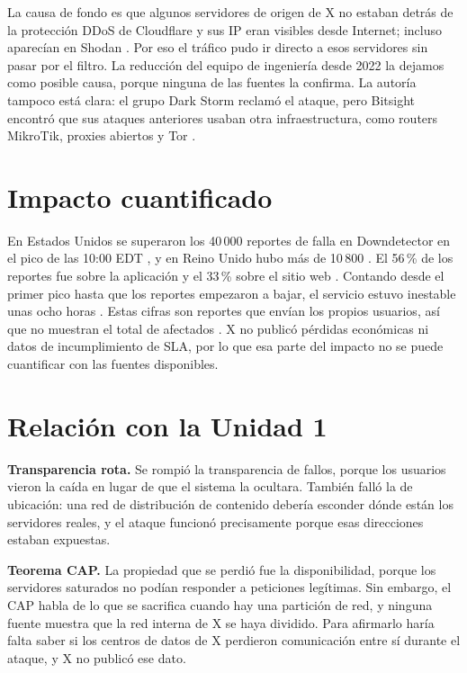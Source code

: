 \documentclass[11pt,a4paper]{article}
\begin{document}
La causa de fondo es que algunos servidores de origen de X no estaban detrás de la protección DDoS de Cloudflare y sus IP eran visibles desde Internet; incluso aparecían en Shodan \cite{bitsight2025ddos}. Por eso el tráfico pudo ir directo a esos servidores sin pasar por el filtro. La reducción del equipo de ingeniería desde 2022 la dejamos como posible causa, porque ninguna de las fuentes la confirma. La autoría tampoco está clara: el grupo Dark Storm reclamó el ataque, pero Bitsight encontró que sus ataques anteriores usaban otra infraestructura, como routers MikroTik, proxies abiertos y Tor \cite{bitsight2025ddos}.

\section{Impacto cuantificado}
En Estados Unidos se superaron los 40\,000 reportes de falla en Downdetector en el pico de las 10:00 EDT \cite{ap2025musk}, y en Reino Unido hubo más de 10\,800 \cite{reuters2025musk}. El 56\,\% de los reportes fue sobre la aplicación y el 33\,\% sobre el sitio web \cite{ap2025musk}. Contando desde el primer pico hasta que los reportes empezaron a bajar, el servicio estuvo inestable unas ocho horas \cite{maruf2025x}. Estas cifras son reportes que envían los propios usuarios, así que no muestran el total de afectados \cite{maruf2025x}. X no publicó pérdidas económicas ni datos de incumplimiento de SLA, por lo que esa parte del impacto no se puede cuantificar con las fuentes disponibles.

\section{Relación con la Unidad 1}
\textbf{Transparencia rota.} Se rompió la transparencia de fallos, porque los usuarios vieron la caída en lugar de que el sistema la ocultara. También falló la de ubicación: una red de distribución de contenido debería esconder dónde están los servidores reales, y el ataque funcionó precisamente porque esas direcciones estaban expuestas.

\textbf{Teorema CAP.} La propiedad que se perdió fue la disponibilidad, porque los servidores saturados no podían responder a peticiones legítimas. Sin embargo, el CAP habla de lo que se sacrifica cuando hay una partición de red, y ninguna fuente muestra que la red interna de X se haya dividido. Para afirmarlo haría falta saber si los centros de datos de X perdieron comunicación entre sí durante el ataque, y X no publicó ese dato.
\end{document}
